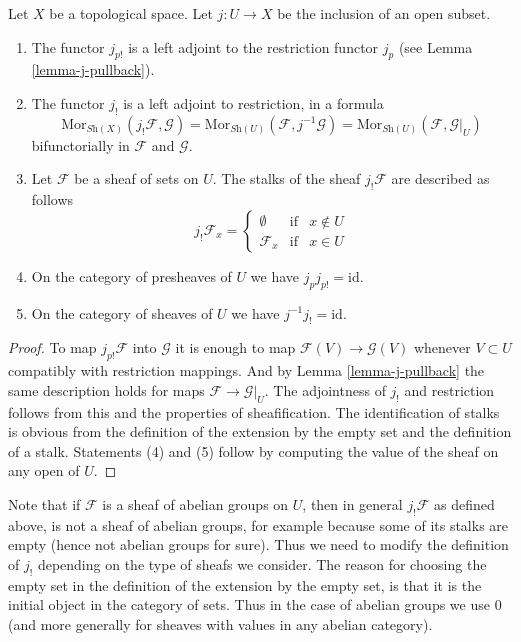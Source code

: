 \begin{lemma}
\label{lemma-j-shriek}
Let $X$ be a topological space.
Let $j : U \to X$ be the inclusion of an open subset.
\begin{enumerate}
\item The functor $j_{p!}$ is a left adjoint to the
restriction functor $j_p$ (see Lemma \ref{lemma-j-pullback}).
\item The functor $j_!$ is a left adjoint to restriction,
in a formula
$$
\text{Mor}_{\textit{Sh}(X)}(j_!\mathcal{F}, \mathcal{G})
=
\text{Mor}_{\textit{Sh}(U)}(\mathcal{F}, j^{-1}\mathcal{G})
=
\text{Mor}_{\textit{Sh}(U)}(\mathcal{F}, \mathcal{G}|_U)
$$
bifunctorially in $\mathcal{F}$ and $\mathcal{G}$.
\item Let $\mathcal{F}$ be a sheaf of sets on $U$.
The stalks of the sheaf $j_!\mathcal{F}$ are described
as follows
$$
j_{!}\mathcal{F}_x =
\left\{
\begin{matrix}
\emptyset & \text{if} & x \not \in U \\
\mathcal{F}_x & \text{if} & x \in U
\end{matrix}
\right.
$$
\item On the category of presheaves of $U$ we have $j_pj_{p!} = \text{id}$.
\item On the category of sheaves of $U$ we have $j^{-1}j_! = \text{id}$.
\end{enumerate}
\end{lemma}

\begin{proof}
To map $j_{p!}\mathcal{F}$ into $\mathcal{G}$
it is enough to map $\mathcal{F}(V) \to \mathcal{G}(V)$
whenever $V \subset U$ compatibly with restriction
mappings. And by Lemma \ref{lemma-j-pullback}
the same description holds for maps
$\mathcal{F} \to \mathcal{G}|_U$.
The adjointness of $j_!$ and restriction follows
from this and the properties of sheafification.
The identification of stalks is obvious from the
definition of the extension by the empty set
and the definition of a stalk.
Statements (4) and (5) follow by computing the
value of the sheaf on any open of $U$.
\end{proof}

\noindent
Note that if $\mathcal{F}$ is a sheaf
of abelian groups on $U$, then in general $j_!\mathcal{F}$ as
defined above, is not a sheaf of abelian groups, for example
because some of its stalks are empty (hence not abelian groups
for sure). Thus we need to modify the definition of
$j_!$ depending on the type of sheafs we consider.
The reason for choosing the empty set in the definition of the
extension by the empty set, is that it is the initial object
in the category of sets. Thus in the case of abelian groups
we use $0$ (and more generally for sheaves with values in
any abelian category).

